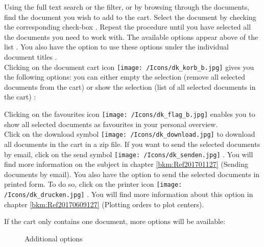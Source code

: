 Using the full text search or the filter, or by browsing through the documents, find the document you wish to add to the cart. Select the document by checking the corresponding check-box . Repeat the procedure until you have selected all the documents you need to work with. The available options appear above of the list . You also have the option to use these options under the individual document titles . \\
Clicking on the document cart icon \texttt{[image: /Icons/dk\_korb\_b.jpg]}  gives you the following options: you can either empty the selection (remove all selected documents from the cart)  or show the selection (list of all selected documents in the cart) :
\begin{figure}[H]
\end{figure}

Clicking on the favourites icon \texttt{[image: /Icons/dk\_flag\_b.jpg]}  enables you to show all selected documents as favourites in your personal overview. \\
Click on the download symbol \texttt{[image: /Icons/dk\_download.jpg]}  to download all documents in the cart in a zip file. If you want to send the selected documents by email, click on the send symbol \texttt{[image: /Icons/dk\_senden.jpg]} . You will find more information on the subject in chapter \ref{bkm:Ref201701127} (Sending documents by email). You also have the option to send the selected documents in printed form. To do so, click on the printer icon \texttt{[image: /Icons/dk\_drucken.jpg]} . You will find more information about this option in chapter \ref{bkm:Ref20170609127} (Plotting orders to plot centers).

\vspace{\baselineskip}

If the cart only contains one document, more options will be available:

\begin{figure}[H]
\caption{Additional options}
\end{figure}

